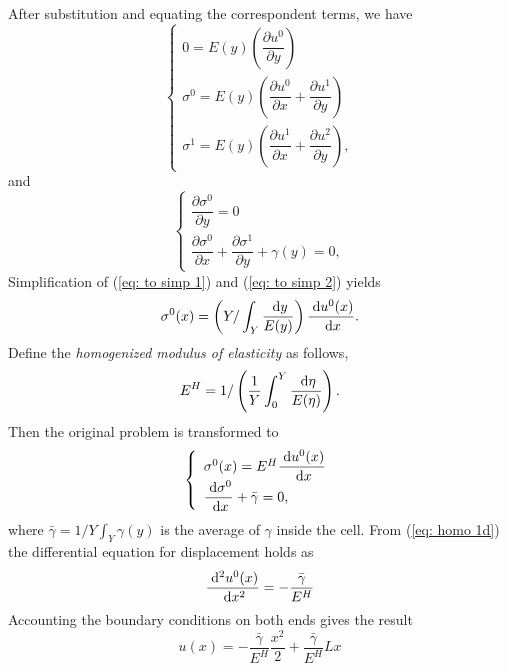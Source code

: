 After substitution and equating the correspondent terms, we have
\begin{equation}
\label{eq: to simp 1}
\left\{
\begin{array}{l}
0 = E(y)\left( \dfrac{\partial u^{0}}{\partial y} \right) \\
\sigma^{0} = E(y) \left( \dfrac{\partial u^{0}}{\partial x} + \dfrac{\partial u^{1}}{\partial y} \right) \\
\sigma^{1} = E(y) \left( \dfrac{\partial u^{1}}{\partial x} + \dfrac{\partial u^{2}}{\partial y} \right),
\end{array}
\right.
\end{equation}
and
\begin{equation}
\label{eq: to simp 2}
\left\{
\begin{array}{l}
\dfrac{\partial \sigma^{0}}{\partial y}=0 \\
\dfrac{\partial \sigma^{0}}{\partial x} + \dfrac{\partial \sigma^{1}}{\partial y} + \gamma(y) = 0, 
\end{array}
\right.
\end{equation}
Simplification of (\ref{eq: to simp 1}) and (\ref{eq: to simp 2}) yields
\begin{equation}
\label{eq: sigma 0}
\sigma^{0}(x) = \left(Y/\int_{Y} \dfrac{\;\mathrm{d}{y}}{E(y)} \right) \dfrac{\;\mathrm{d}{u^{0}(x)}}{\;\mathrm{d}{x}}.
\end{equation}
Define the \textit{homogenized modulus of elasticity} as follows,
\begin{equation}
E^{H} = 1/ \left( \dfrac{1}{Y} \int_{0}^{Y} \dfrac{\;\mathrm{d}{\eta}}{E(\eta)}\right) .
\end{equation}
Then the original problem is transformed to
\begin{equation}
\label{eq: homo 1d}
\left\{
\begin{array}{l}
\sigma^{0}(x) = E^{H} \dfrac{\;\mathrm{d}{u^{0}(x)}}{\;\mathrm{d}{x}} \\
\dfrac{\;\mathrm{d}{\sigma^{0}}}{\;\mathrm{d}{x}} + \bar{\gamma} = 0,
\end{array}
\right.
\end{equation}
where $\bar{\gamma}=1/Y \int_{Y} \gamma(y)$ is the average of $\gamma$ inside the cell. From (\ref{eq: homo 1d}) the differential equation for displacement holds as
\begin{equation}
\dfrac{\;\mathrm{d}^2 u^{0}(x)}{\;\mathrm{d}{x^{2}}} = -\dfrac{\bar{\gamma}}{E^{H}}
\end{equation}
Accounting the boundary conditions on both ends gives the result
\[u(x) = -\dfrac{\bar{\gamma}}{E^{H}} \dfrac{x^{2}}{2} + \dfrac{\bar{\gamma}}{E^{H}} Lx \]

